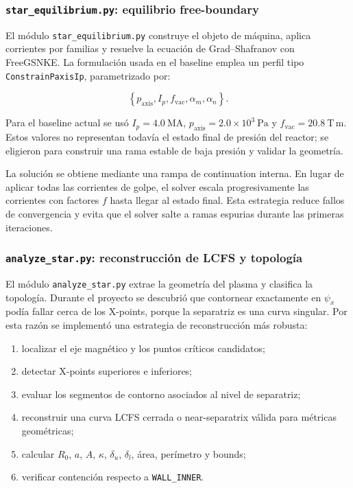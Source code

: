 \documentclass[11pt,a4paper]{article}
\begin{document}
\subsubsection{\texttt{star\_equilibrium.py}: equilibrio free-boundary}
El módulo \texttt{star\_equilibrium.py} construye el objeto de máquina, aplica corrientes por
familias y resuelve la ecuación de Grad--Shafranov con FreeGSNKE. La formulación usada en el
baseline emplea un perfil tipo \texttt{ConstrainPaxisIp}, parametrizado por:

\[
\left\{p_{\mathrm{axis}}, I_p, f_{\mathrm{vac}}, \alpha_m, \alpha_n\right\}.
\]

Para el baseline actual se usó $I_p=4.0~\mathrm{MA}$, $p_{\mathrm{axis}}=2.0\times10^3~\mathrm{Pa}$
y $f_{\mathrm{vac}}=20.8~\mathrm{T\,m}$. Estos valores no representan todavía el estado final de
presión del reactor; se eligieron para construir una rama estable de baja presión y validar la
geometría.

La solución se obtiene mediante una rampa de continuation interna. En lugar de aplicar todas
las corrientes de golpe, el solver escala progresivamente las corrientes con factores $f$ hasta
llegar al estado final. Esta estrategia reduce fallos de convergencia y evita que el solver salte
a ramas espurias durante las primeras iteraciones.

\subsubsection{\texttt{analyze\_star.py}: reconstrucción de LCFS y topología}
El módulo \texttt{analyze\_star.py} extrae la geometría del plasma y clasifica la topología.
Durante el proyecto se descubrió que contornear exactamente en $\psi_x$ podía fallar cerca de
los X-points, porque la separatriz es una curva singular. Por esta razón se implementó una
estrategia de reconstrucción más robusta:

\begin{enumerate}
    \item localizar el eje magnético y los puntos críticos candidatos;
    \item detectar X-points superiores e inferiores;
    \item evaluar los segmentos de contorno asociados al nivel de separatriz;
    \item reconstruir una curva LCFS cerrada o near-separatrix válida para métricas geométricas;
    \item calcular $R_0$, $a$, $A$, $\kappa$, $\delta_u$, $\delta_l$, área, perímetro y bounds;
    \item verificar contención respecto a \texttt{WALL\_INNER}.
\end{enumerate}
\end{document}
